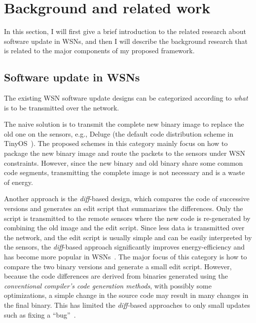 \chapter{Background and related work}\label{chap:related}

In this section, I will first give a brief introduction to the related research about software update in WSNs, and 
then I will describe the background research that is related to the major components of my proposed framework.


\section{Software update in WSNs}

The existing WSN software update designs can be categorized according to {\em what} is to be transmitted over the 
network. 

The naive solution is to transmit the complete new binary image to replace the old one on the sensors, e.g., Deluge 
(the default code distribution scheme in TinyOS~\cite{tinyos}).
The proposed schemes in this category mainly focus on how to package the new binary image and route the packets to the 
sensors under WSN constraints.
However, since the new binary and old binary share some common code segments, transmitting the complete image is not 
necessary and is a waste of energy.

Another approach is the {\em diff}-based design, which compares the code of successive versions and generates an edit 
script that summarizes the differences.
Only the script is transmitted to the remote sensors where the new code is re-generated by combining the old image and 
the edit script.  Since
less data is transmitted over the network, and the edit script is usually simple and can be easily interpreted by the 
sensors, the {\em diff}-based approach significantly improves energy-efficiency and has
become more popular in 
WSNs~\cite{related:script,stream,related:jeong-script,related:dynamic1,related:dynamic2,related:flexcup}.
The major focus of this category is how to compare the two binary versions and generate a small edit script.
However, because the code differences are derived from binaries generated using the {\em conventional compiler's code 
generation methods}, with possibly some optimizations, a simple change in the source code may result in many changes in 
the final binary. This has limited the {\em diff-}based approaches to only small updates such as fixing a 
``bug''~\cite{related:script}.



